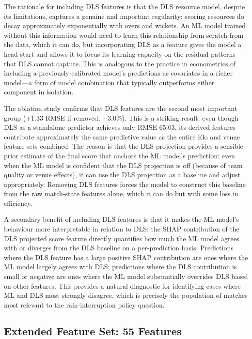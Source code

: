 \documentclass[10pt,a4paper,twocolumn]{article}
\begin{document}
The rationale for including DLS features is that the DLS resource model, despite its limitations, captures a genuine and important regularity: scoring resources do decay approximately exponentially with overs and wickets. An ML model trained without this information would need to learn this relationship from scratch from the data, which it can do, but incorporating DLS as a feature gives the model a head start and allows it to focus its learning capacity on the residual patterns that DLS cannot capture. This is analogous to the practice in econometrics of including a previously-calibrated model's predictions as covariates in a richer model---a form of model combination that typically outperforms either component in isolation.

The ablation study confirms that DLS features are the second most important group ($+$1.33 RMSE if removed, $+$3.0\%). This is a striking result: even though DLS as a standalone predictor achieves only RMSE 65.03, its derived features contribute approximately the same predictive value as the entire Elo and venue feature sets combined. The reason is that the DLS projection provides a sensible prior estimate of the final score that anchors the ML model's prediction: even when the ML model is confident that the DLS projection is off (because of team quality or venue effects), it can use the DLS projection as a baseline and adjust appropriately. Removing DLS features forces the model to construct this baseline from the raw match-state features alone, which it can do but with some loss in efficiency.

A secondary benefit of including DLS features is that it makes the ML model's behaviour more interpretable in relation to DLS: the SHAP contribution of the DLS projected score feature directly quantifies how much the ML model agrees with or diverges from the DLS baseline on a per-prediction basis. Predictions where the DLS feature has a large positive SHAP contribution are ones where the ML model largely agrees with DLS; predictions where the DLS contribution is small or negative are ones where the ML model substantially overrides DLS based on other features. This provides a natural diagnostic for identifying cases where ML and DLS most strongly disagree, which is precisely the population of matches most relevant to the rain-interruption policy question.

\subsection{Extended Feature Set: 55 Features}
\end{document}
